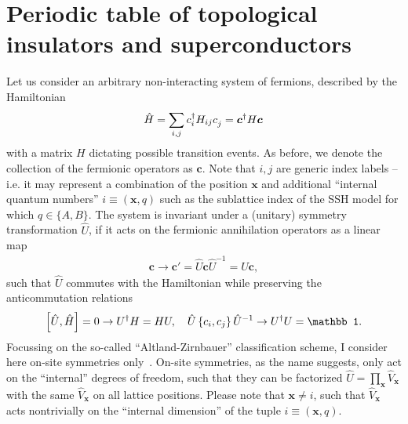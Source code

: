 \section{Periodic table of topological insulators and superconductors}
\label{sec:Periodic_table_of_topological_insulators_and_superconductors}
%
%
Let us consider an arbitrary non-interacting system of fermions, described by the Hamiltonian
\begin{align}
    \hat H = \sum_{i,j}c^\dag_{i}H_{ij}c^\pdag_j = {\bm c}^\dag H {\bm c}^\pdag
\end{align}
with a matrix $H$ dictating possible transition events.
As before, we denote the collection of the fermionic operators as $\bm c$.
Note that $i,j$ are generic index labels -- i.e. it may represent a combination of the position $\bm x$ and additional ``internal quantum numbers'' $i\equiv(\bm x,q)$ such as the sublattice index of the SSH model for which $q\in \{A,B\}$.
The system is invariant under a (unitary) symmetry transformation $\hat U$, if it acts on the fermionic annihilation operators as a linear map
\begin{align}
    {\bm c}\rightarrow {\bm c}' = \hat U {\bm c} \hat U^{-1} = U {\bm c},
\end{align}
such that $\hat U$ commutes with the Hamiltonian while preserving the anticommutation relations
\begin{align}
    \commutator{\hat U,\hat H} = 0
    \rightarrow
    U^\dag H = H U
    ,
    \quad
    \hat U\anticommutator{c_i,c_j}\hat U^{-1}
    \rightarrow
    U^\dag U = \mathbb1.
\end{align}
Focussing on the so-called ``Altland-Zirnbauer'' classification scheme, I consider here on-site symmetries only~\cite{Altland1997}.
On-site symmetries, as the name suggests, only act on the ``internal'' degrees of freedom, such that they can be factorized $\hat U=\prod_{\bm x}\hat V_{\bm x}$ with the same $\hat V_{\bm x}$ on all lattice positions.
Please note that ${\bm x}\neq i$, such that $\hat V_{\bm x}$ acts nontrivially on the ``internal dimension'' of the tuple $i\equiv({\bm x},q)$.

